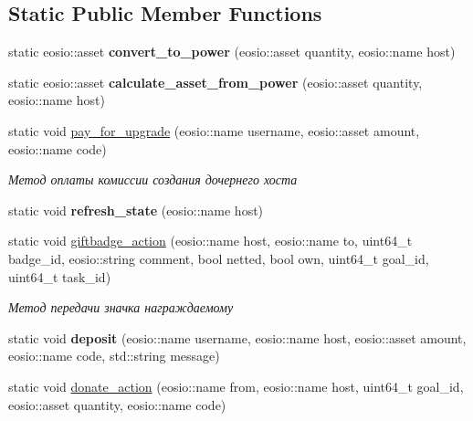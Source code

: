 \subsection*{Static Public Member Functions}
\begin{DoxyCompactItemize}
\item 
\mbox{\label{classunicore_a739255f27ec8bb084f76fcb8cd5c33d8}} 
static eosio\+::asset {\bfseries convert\+\_\+to\+\_\+power} (eosio\+::asset quantity, eosio\+::name host)
\item 
\mbox{\label{classunicore_aae7a94db6860df276fd7821044144a3e}} 
static eosio\+::asset {\bfseries calculate\+\_\+asset\+\_\+from\+\_\+power} (eosio\+::asset quantity, eosio\+::name host)
\item 
static void \mbox{\hyperlink{classunicore_a4f4a69c310c073c6cf1ebf41f2c210e8}{pay\+\_\+for\+\_\+upgrade}} (eosio\+::name username, eosio\+::asset amount, eosio\+::name code)
\begin{DoxyCompactList}\small\item\em Метод оплаты комиссии создания дочернего хоста \end{DoxyCompactList}\item 
\mbox{\label{classunicore_a8703f9141c36861284ca003a348b61d0}} 
static void {\bfseries refresh\+\_\+state} (eosio\+::name host)
\item 
static void \mbox{\hyperlink{classunicore_a8cdb743e8708845d4a6064d43400d415}{giftbadge\+\_\+action}} (eosio\+::name host, eosio\+::name to, uint64\+\_\+t badge\+\_\+id, eosio\+::string comment, bool netted, bool own, uint64\+\_\+t goal\+\_\+id, uint64\+\_\+t task\+\_\+id)
\begin{DoxyCompactList}\small\item\em Метод передачи значка награждаемому \end{DoxyCompactList}\item 
\mbox{\label{classunicore_ac1a80266ee2fcc4565d3e0924eaf2c60}} 
static void {\bfseries deposit} (eosio\+::name username, eosio\+::name host, eosio\+::asset amount, eosio\+::name code, std\+::string message)
\item 
static void \mbox{\hyperlink{classunicore_a466aba74657c6022cc0d9163bd502625}{donate\+\_\+action}} (eosio\+::name from, eosio\+::name host, uint64\+\_\+t goal\+\_\+id, eosio\+::asset quantity, eosio\+::name code)

\end{DoxyCompactItemize}
